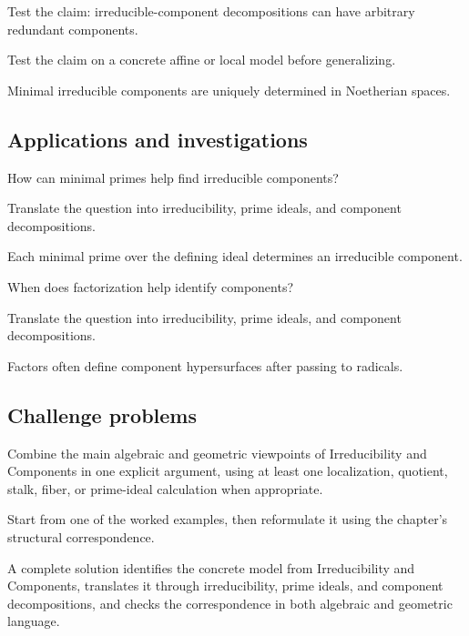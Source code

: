 \begin{exercise}\label{exr:vi05-expand-12}
Test the claim: irreducible-component decompositions can have arbitrary redundant components.
\end{exercise}
\begin{hint}
Test the claim on a concrete affine or local model before generalizing.
\end{hint}
\begin{solution}
Minimal irreducible components are uniquely determined in Noetherian spaces.
\end{solution}

\subsection*{Applications and investigations}

\begin{exercise}\label{exr:vi05-expand-13}
How can minimal primes help find irreducible components?
\end{exercise}
\begin{hint}
Translate the question into irreducibility, prime ideals, and component decompositions.
\end{hint}
\begin{solution}
Each minimal prime over the defining ideal determines an irreducible component.
\end{solution}

\begin{exercise}\label{exr:vi05-expand-14}
When does factorization help identify components?
\end{exercise}
\begin{hint}
Translate the question into irreducibility, prime ideals, and component decompositions.
\end{hint}
\begin{solution}
Factors often define component hypersurfaces after passing to radicals.
\end{solution}

\subsection*{Challenge problems}

\begin{exercise}\label{exr:vi05-expand-15}
Combine the main algebraic and geometric viewpoints of Irreducibility and Components in one explicit argument, using at least one localization, quotient, stalk, fiber, or prime-ideal calculation when appropriate.
\end{exercise}
\begin{hint}
Start from one of the worked examples, then reformulate it using the chapter's structural correspondence.
\end{hint}
\begin{solution}
A complete solution identifies the concrete model from Irreducibility and Components, translates it through irreducibility, prime ideals, and component decompositions, and checks the correspondence in both algebraic and geometric language.
\end{solution}

